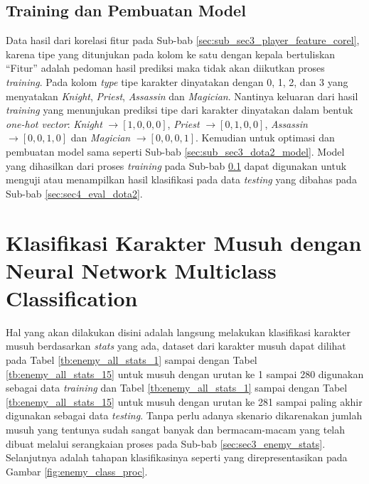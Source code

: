 \subsection{Training dan Pembuatan Model}
\label{sec:sub_sec3_player_char_train}
\vspace{1ex}

Data hasil dari korelasi fitur pada Sub-bab \ref{sec:sub_sec3_player_feature_corel}, karena tipe yang ditunjukan pada kolom ke satu dengan kepala bertuliskan ``Fitur'' adalah pedoman hasil prediksi maka tidak akan diikutkan proses \textit{training}. Pada kolom \textit{type} tipe karakter dinyatakan dengan 0, 1, 2, dan 3 yang menyatakan \textit{Knight}, \textit{Priest}, \textit{Assassin} dan \textit{Magician}. Nantinya keluaran dari hasil \textit{training} yang menunjukan prediksi tipe dari karakter dinyatakan dalam bentuk \textit{one-hot vector}: \textit{Knight} $\rightarrow [1, 0, 0, 0]$, \textit{Priest} $\rightarrow [0, 1, 0, 0]$, \textit{Assassin} $\rightarrow [0, 0, 1, 0]$ dan \textit{Magician} $\rightarrow [0, 0, 0, 1]$. Kemudian untuk optimasi dan pembuatan model sama seperti Sub-bab \ref{sec:sub_sec3_dota2_model}. Model yang dihasilkan dari proses \textit{training} pada Sub-bab \ref{sec:sub_sec3_player_char_train} dapat digunakan untuk menguji atau menampilkan hasil klasifikasi pada data \textit{testing} yang dibahas pada Sub-bab \ref{sec:sec4_eval_dota2}.
\vspace{1ex}

\section{Klasifikasi Karakter Musuh dengan Neural Network Multiclass Classification}
\label{sec:sec3_enemy_method}
\vspace{1ex}

Hal yang akan dilakukan disini adalah langsung melakukan klasifikasi karakter musuh berdasarkan \textit{stats} yang ada, dataset dari karakter musuh dapat dilihat pada Tabel \ref{tb:enemy_all_stats_1} sampai dengan Tabel \ref{tb:enemy_all_stats_15} untuk musuh dengan urutan ke 1 sampai 280 digunakan sebagai data \textit{training} dan Tabel \ref{tb:enemy_all_stats_1} sampai dengan Tabel \ref{tb:enemy_all_stats_15} untuk musuh dengan urutan ke 281 sampai paling akhir digunakan sebagai data \textit{testing}. Tanpa perlu adanya skenario dikarenakan jumlah musuh yang tentunya sudah sangat banyak dan bermacam-macam yang telah dibuat melalui serangkaian proses pada Sub-bab \ref{sec:sec3_enemy_stats}. Selanjutnya adalah tahapan klasifikasinya seperti yang direpresentasikan pada Gambar \ref{fig:enemy_class_proc}.
\vspace{1ex}

